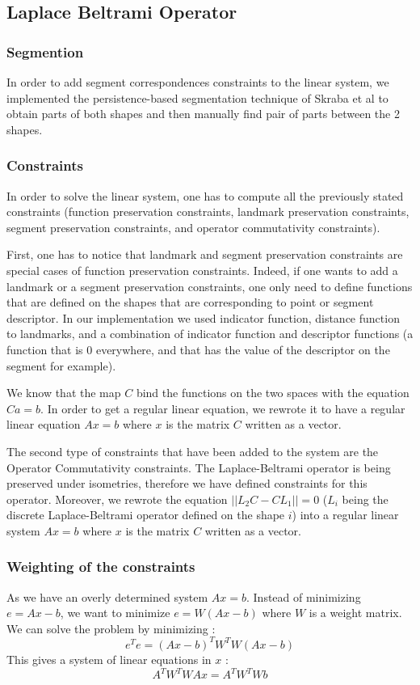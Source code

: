 \documentclass[10pt,twocolumn,letterpaper]{article}
\begin{document}
\subsection{Laplace Beltrami Operator}
\subsubsection*{Segmention} %
In order to add segment correspondences constraints to the linear system, we implemented the persistence-based segmentation technique of Skraba et al to obtain parts of both shapes and then manually find pair of parts between the 2 shapes.
\subsubsection*{Constraints} %
In order to solve the linear system, one has to compute all the previously stated constraints (function preservation constraints, landmark preservation constraints, segment preservation constraints, and operator commutativity constraints). 

First, one has to notice that landmark and segment preservation constraints are special cases of function preservation constraints. Indeed, if one wants to add a landmark or a segment preservation constraints, one only need to define functions that are defined on the shapes that are corresponding to point or segment descriptor. In our implementation we used indicator function, distance function to landmarks, and a combination of indicator function and descriptor functions (a function that is $0$ everywhere, and that has the value of the descriptor on the segment for example). 

We know that the map $C$ bind the functions on the two spaces with the equation $Ca = b$. In order to get a regular linear equation, we rewrote it to have a regular linear equation $Ax = b$ where $x$ is the matrix $C$ written as a vector.

The second type of constraints that have been added to the system are the Operator Commutativity constraints. The Laplace-Beltrami operator is being preserved under isometries, therefore we have defined constraints for this operator. Moreover, we rewrote the equation $||L_{2}C - CL_{1}|| = 0$ ($L_{i}$ being the discrete Laplace-Beltrami operator defined on the shape $i$) into a regular linear system $Ax = b$ where $x$ is the matrix $C$ written as a vector. 

\subsubsection*{Weighting of the constraints}
As we have an overly determined system $Ax = b$. Instead of minimizing $e = Ax-b$, we want to minimize $e = W(Ax-b)$ where $W$ is a weight matrix. We can solve the problem by minimizing :
\begin{equation}
e^{T}e = (Ax-b)^{T}W^{T}W(Ax-b)
\end{equation}
This gives a system of linear equations in $x$ :
\begin{equation}
A^{T}W^{T}WAx = A^{T}W^{T}Wb
\end{equation}
\end{document}

